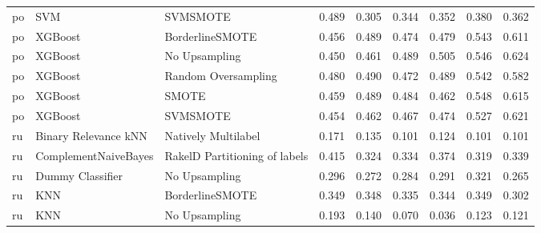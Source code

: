 \begin{tabular}{lllllllll}
      po &                             SVM &                      SVMSMOTE & 0.489 &                     0.305 &                 0.344 &                  0.352 &                                   0.380 &     0.362 \\
      po &                         XGBoost &               BorderlineSMOTE & 0.456 &                     0.489 &                 0.474 &                  0.479 &                                   0.543 &     0.611 \\
      po &                         XGBoost &                 No Upsampling & 0.450 &                     0.461 &                 0.489 &                  0.505 &                                   0.546 &     0.624 \\
      po &                         XGBoost &           Random Oversampling & 0.480 &                     0.490 &                 0.472 &                  0.489 &                                   0.542 &     0.582 \\
      po &                         XGBoost &                         SMOTE & 0.459 &                     0.489 &                 0.484 &                  0.462 &                                   0.548 &     0.615 \\
      po &                         XGBoost &                      SVMSMOTE & 0.454 &                     0.462 &                 0.467 &                  0.474 &                                   0.527 &     0.621 \\
      ru &            Binary Relevance kNN &           Natively Multilabel & 0.171 &                     0.135 &                 0.101 &                  0.124 &                                   0.101 &     0.101 \\
      ru &            ComplementNaiveBayes & RakelD Partitioning of labels & 0.415 &                     0.324 &                 0.334 &                  0.374 &                                   0.319 &     0.339 \\
      ru &                Dummy Classifier &                 No Upsampling & 0.296 &                     0.272 &                 0.284 &                  0.291 &                                   0.321 &     0.265 \\
      ru &                             KNN &               BorderlineSMOTE & 0.349 &                     0.348 &                 0.335 &                  0.344 &                                   0.349 &     0.302 \\
      ru &                             KNN &                 No Upsampling & 0.193 &                     0.140 &                 0.070 &                  0.036 &                                   0.123 &     0.121 \\

\end{tabular}
